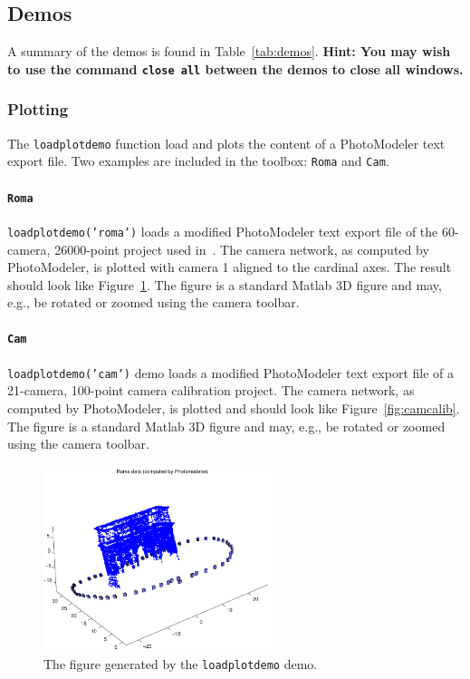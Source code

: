 \documentclass{article}
\begin{document}
\subsection{Demos}
\label{sec:demos}
A summary of the demos is found in Table~\ref{tab:demos}.
\textbf{Hint: You may wish to use the command \texttt{close all} between the demos to close
all windows.}

\subsubsection{Plotting}
\label{sec:loadplotdemo}
The \texttt{loadplotdemo} function load and plots the content of a
PhotoModeler text export file. Two examples are included in the
toolbox: \texttt{Roma} and \texttt{Cam}.

\paragraph{\texttt{Roma}}
\label{sec:orgaa99904}

\texttt{loadplotdemo('roma')} loads a modified PhotoModeler text export file
of the 60-camera, 26000-point project used
in~\citet{Borlin2013:Bundle}. The camera network, as computed by
PhotoModeler, is plotted with camera 1 aligned to the cardinal axes.
The result should look like Figure~\ref{fig:roma}. The figure is a
standard Matlab 3D figure and may, e.g., be rotated or zoomed using
the camera toolbar.

\paragraph{\texttt{Cam}}
\label{sec:camcaldata}
\texttt{loadplotdemo('cam')} demo loads a modified PhotoModeler text export
file of a 21-camera, 100-point camera calibration project. The camera
network, as computed by PhotoModeler, is plotted and should look like
Figure~\ref{fig:camcalib}. The figure is a standard Matlab 3D figure and
may, e.g., be rotated or zoomed using the camera toolbar.


\begin{figure}[tbp]
\centering
\includegraphics[width=0.6\textwidth]{./ill/roma.pdf}
\caption{\label{fig:roma}
The figure generated by the \texttt{loadplotdemo} demo.}
\end{figure}
\end{document}
